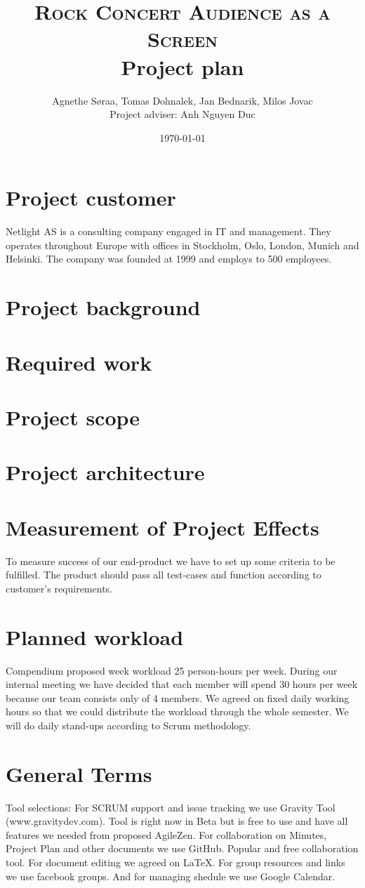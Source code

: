 \documentclass{article}
\title{
    \normalsize \textsc{Rock Concert Audience as a Screen}\\
    \Huge Project plan}
\author{Agnethe Søraa,
Tomas Dohnalek,
Jan Bednarik,
Milos Jovac \\
\normalsize Project adviser: Anh Nguyen Duc}
\date{\today}
\begin{document}
\maketitle
\section{Project customer}
Netlight AS is a consulting company engaged in IT and management. They operates throughout Europe with offices in Stockholm, Oslo, London, Munich and Helsinki. The company was founded at 1999 and employs to 500 employees.

\section{Project background}
\section{Required work}
\section{Project scope}


\section{Project architecture}


\section{Measurement of Project Effects}
To measure success of our end-product we have to set up some criteria to be fulfilled. The product should pass all test-cases and function according to customer's requirements.

\section{Planned workload}
Compendium proposed week workload 25 person-hours per week. During our internal meeting we have decided that each member will spend 30 hours per week because our team consists only of 4 members. We agreed on fixed daily working hours so that we could distribute the workload through the whole semester. We will do daily stand-ups according to Scrum methodology.

\section{General Terms}
Tool selections:
 For SCRUM support and issue tracking we use Gravity Tool (www.gravitydev.com). Tool is right now in Beta but is free to use and have all features we needed from
 proposed AgileZen.
 For collaboration on Minutes, Project Plan and other documents we use GitHub. Popular and free collaboration tool.
 For document editing we agreed on LaTeX.
 For group resources and links we use facebook groups. And for managing shedule we use Google Calendar.
 
\end{document}
